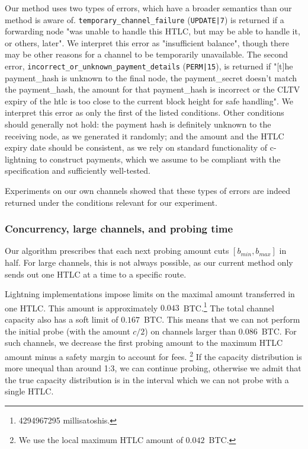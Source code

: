 Our method uses two types of errors, which have a broader semantics than our method is aware of.
\texttt{temporary\_channel\_failure} (\texttt{UPDATE|7}) is returned if a forwarding node "was unable to handle this HTLC, but may be able to handle it, or others, later".
We interpret this error as "insufficient balance", though there may be other reasons for a channel to be temporarily unavailable.
The second error, \texttt{incorrect\_or\_unknown\_payment\_details} (\texttt{PERM|15}), is returned if "[t]he payment\_hash is unknown to the final node, the payment\_secret doesn't match the payment\_hash, the amount for that payment\_hash is incorrect or the CLTV expiry of the htlc is too close to the current block height for safe handling".
We interpret this error as only the first of the listed conditions.
Other conditions should generally not hold: the payment hash is definitely unknown to the receiving node, as we generated it randomly; and the amount and the HTLC expiry date should be consistent, as we rely on standard functionality of c-lightning to construct payments, which we assume to be compliant with the specification and sufficiently well-tested.

Experiments on our own channels showed that these types of errors are indeed returned under the conditions relevant for our experiment.


\subsubsection*{Concurrency, large channels, and probing time}

Our algorithm prescribes that each next probing amount cuts $[b_{min}, b_{max}]$ in half.
For large channels, this is not always possible, as our current method only sends out one HTLC at a time to a specific route.

Lightning implementations impose limits on the maximal amount transferred in one HTLC.
This amount is approximately $0.043$~BTC.\footnote{4294967295 millisatoshis.}
The total channel capacity also has a soft limit of $0.167$~BTC.
This means that we can not perform the initial probe (with the amount $c / 2$) on channels larger than $0.086$~BTC.
For such channels, we decrease the first probing amount to the maximum HTLC amount minus a safety margin to account for fees.
\footnote{We use the local maximum HTLC amount of $0.042$~BTC.}
If the capacity distribution is more unequal than around 1:3, we can continue probing, otherwise we admit that the true capacity distribution is in the interval which we can not probe with a single HTLC.

